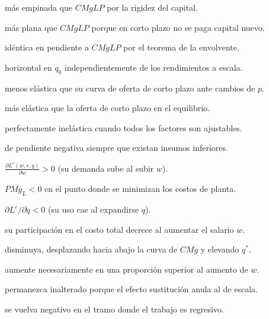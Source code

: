 \begin{opts}
    \item más empinada que $CMgLP$ por la rigidez del capital.
    \item más plana que $CMgLP$ porque en corto plazo no se paga capital nuevo.
    \item idéntica en pendiente a $CMgLP$ por el teorema de la envolvente.
    \item horizontal en $q_0$ independientemente de los rendimientos a escala.
\end{opts}

\begin{opts}
    \item menos elástica que su curva de oferta de corto plazo ante cambios de $p$.
    \item más elástica que la oferta de corto plazo en el equilibrio.
    \item perfectamente inelástica cuando todos los factores son ajustables.
    \item de pendiente negativa siempre que existan insumos inferiores.
\end{opts}

\begin{opts}
    \item $\frac{\partial L^c(w,r,q)}{\partial w} > 0$ (su demanda sube al subir $w$).
    \item $PMg_L < 0$ en el punto donde se minimizan los costos de planta.
    \item $\partial L^c/\partial q < 0$ (su uso cae al expandirse $q$).
    \item su participación en el costo total decrece al aumentar el salario $w$.
\end{opts}

\begin{opts}
    \item disminuya, desplazando hacia abajo la curva de $CMg$ y elevando $q^*$.
    \item aumente necesariamente en una proporción superior al aumento de $w$.
    \item permanezca inalterado porque el efecto sustitución anula al de escala.
    \item se vuelva negativo en el tramo donde el trabajo es regresivo.
\end{opts}

